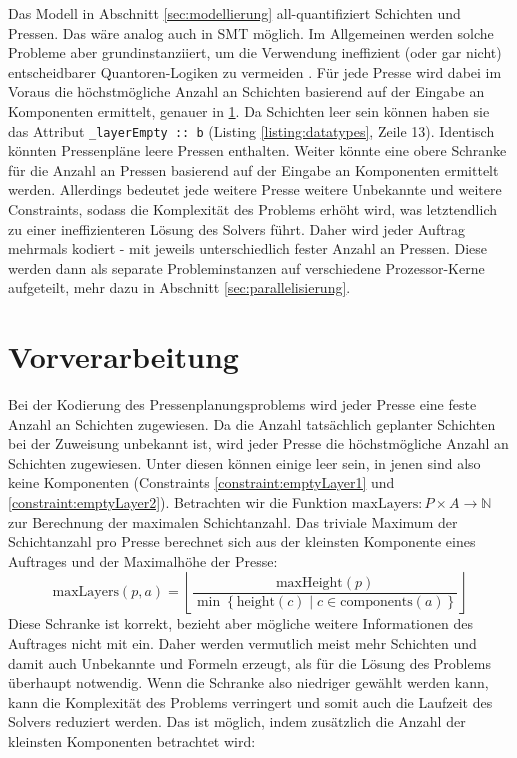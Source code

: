 Das Modell in Abschnitt \ref{sec:modellierung} all-quantifiziert Schichten und Pressen.
Das wäre analog auch in SMT möglich.
Im Allgemeinen werden solche Probleme aber grundinstanziiert,
um die Verwendung ineffizient (oder gar nicht) entscheidbarer Quantoren-Logiken zu vermeiden \cite{smtquantifiersarehard, smtquantifiersarehard2}.
Für jede Presse wird dabei im Voraus die höchstmögliche Anzahl an Schichten basierend auf der Eingabe an Komponenten ermittelt, genauer in \ref{sec:vorverarbeitung}.
Da Schichten leer sein können haben sie das Attribut \texttt{\_layerEmpty :: b} (Listing \ref{listing:datatypes}, Zeile 13).
Identisch könnten Pressenpläne leere Pressen enthalten.
Weiter könnte eine obere Schranke für die Anzahl an Pressen basierend auf der Eingabe an Komponenten ermittelt werden.
Allerdings bedeutet jede weitere Presse weitere Unbekannte und weitere Constraints, sodass die Komplexität des Problems erhöht wird,
was letztendlich zu einer ineffizienteren Lösung des Solvers führt.
Daher wird jeder Auftrag mehrmals kodiert - mit jeweils unterschiedlich fester Anzahl an Pressen.
Diese werden dann als separate Probleminstanzen auf verschiedene Prozessor-Kerne aufgeteilt, mehr dazu in Abschnitt \ref{sec:parallelisierung}.

\section{Vorverarbeitung}
\label{sec:vorverarbeitung}
Bei der Kodierung des Pressenplanungsproblems wird jeder Presse eine feste Anzahl an Schichten zugewiesen.
Da die Anzahl tatsächlich geplanter Schichten bei der Zuweisung unbekannt ist, wird jeder Presse die höchstmögliche Anzahl an Schichten zugewiesen.
Unter diesen können einige leer sein, in jenen sind also keine Komponenten (Constraints \ref{constraint:emptyLayer1} und \ref{constraint:emptyLayer2}).
Betrachten wir die Funktion $\text{maxLayers}: P \times A \rightarrow \mathbb{N}$ zur Berechnung der maximalen Schichtanzahl.
Das triviale Maximum der Schichtanzahl pro Presse berechnet sich aus der kleinsten Komponente eines Auftrages und der Maximalhöhe der Presse:
\[
    \text{maxLayers}(p,a) = \left\lfloor \frac{\text{maxHeight}(p)}{\min \left\{ \text{height}(c) \mid c \in \text{components}(a) \right\}} \right\rfloor
\]
Diese Schranke ist korrekt, bezieht aber mögliche weitere Informationen des Auftrages nicht mit ein.
Daher werden vermutlich meist mehr Schichten und damit auch Unbekannte und Formeln erzeugt, als für die Lösung des Problems überhaupt notwendig.
Wenn die Schranke also niedriger gewählt werden kann, kann die Komplexität des Problems verringert und somit auch die Laufzeit des Solvers reduziert werden.
Das ist möglich, indem zusätzlich die Anzahl der kleinsten Komponenten betrachtet wird:

